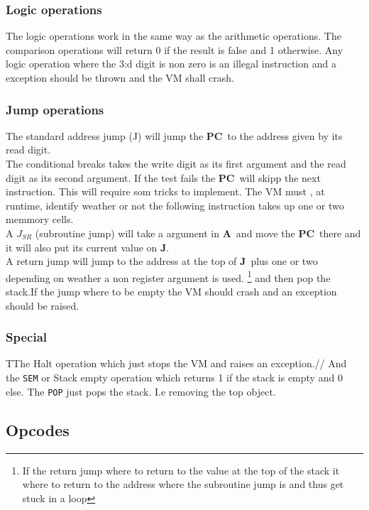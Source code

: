 \documentclass{article}
\newcommand{\A}{$\textbf{A}$}
\newcommand{\pc}{$\textbf{PC}$}
\newcommand{\J}{$\textbf{J}$}
\newcommand{\V}{\verb}
\begin{document}
\subsubsection{Logic operations}
The logic operations work in the same way as the arithmetic operations. The
comparison operations will return 0 if the result is false and 1 otherwise.
Any logic operation where the 3:d digit is non zero is an illegal instruction
and a exception should be thrown and the VM shall crash.

\subsubsection{Jump operations}
The standard address jump (J) will jump the \pc \ to the address given by its
read digit.\\
The conditional breaks takes the write digit as its first argument and the read
digit as its second argument. If the test fails the \pc \ will skipp the next
instruction. This will require som tricks to implement. The VM must , at
runtime, identify weather or not the following instruction takes up one or two
memmory cells.\\

A $J_{SR}$ (subroutine jump) will take a argument in \A \ and move the \pc \
there and it will also put its current value on \J.\\
A return jump will jump to the address at the top of \J \ plus one or two
depending on weather a non register argument is used.
 \footnote{If the return jump where to return to the value at the top of the
 stack it where to return to the address where the subroutine jump is and thus 
 get stuck in a loop} and then pop the stack.If the jump where to be empty the 
 VM should crash and an exception should be raised.\\


\subsubsection{Special}
TThe Halt operation which just stops the VM and
raises an exception.//
And the \V+SEM+ or Stack empty operation which returns 1 if the stack is empty
and 0 else.
The \V+POP+ just pops the stack. I.e removing the top object.

\subsection{Opcodes}
\end{document}
